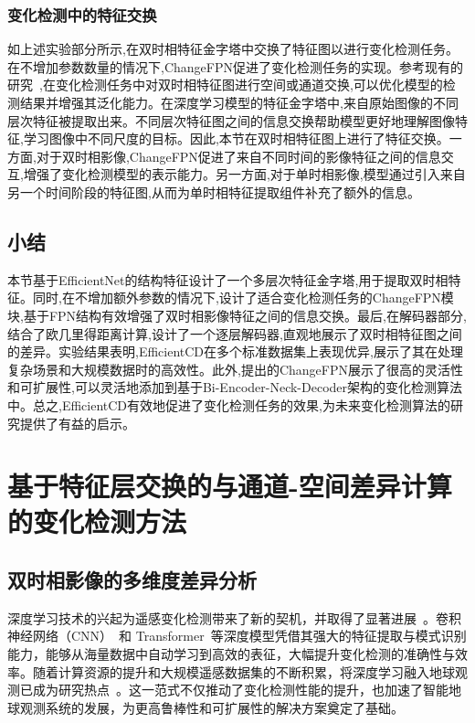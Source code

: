 \subsubsection{变化检测中的特征交换}

如上述实验部分所示,在双时相特征金字塔中交换了特征图以进行变化检测任务。在不增加参数数量的情况下,ChangeFPN促进了变化检测任务的实现。参考现有的研究~\cite{Fang2022ChangerFI},在变化检测任务中对双时相特征图进行空间或通道交换,可以优化模型的检测结果并增强其泛化能力。在深度学习模型的特征金字塔中,来自原始图像的不同层次特征被提取出来。不同层次特征图之间的信息交换帮助模型更好地理解图像特征,学习图像中不同尺度的目标。因此,本节在双时相特征图上进行了特征交换。一方面,对于双时相影像,ChangeFPN促进了来自不同时间的影像特征之间的信息交互,增强了变化检测模型的表示能力。另一方面,对于单时相影像,模型通过引入来自另一个时间阶段的特征图,从而为单时相特征提取组件补充了额外的信息。

\subsection{小结}

本节基于EfficientNet的结构特征设计了一个多层次特征金字塔,用于提取双时相特征。同时,在不增加额外参数的情况下,设计了适合变化检测任务的ChangeFPN模块,基于FPN结构有效增强了双时相影像特征之间的信息交换。最后,在解码器部分,结合了欧几里得距离计算,设计了一个逐层解码器,直观地展示了双时相特征图之间的差异。实验结果表明,EfficientCD在多个标准数据集上表现优异,展示了其在处理复杂场景和大规模数据时的高效性。此外,提出的ChangeFPN展示了很高的灵活性和可扩展性,可以灵活地添加到基于Bi-Encoder-Neck-Decoder架构的变化检测算法中。总之,EfficientCD有效地促进了变化检测任务的效果,为未来变化检测算法的研究提供了有益的启示。


\section{基于特征层交换的与通道-空间差异计算的变化检测方法}
\subsection{双时相影像的多维度差异分析}

深度学习技术的兴起为遥感变化检测带来了新的契机，并取得了显著进展~\cite{ting_bai_deep_2023}。卷积神经网络（CNN）~\cite{He2015DeepRL}和 Transformer~\cite{Vaswani2017AttentionIA}等深度模型凭借其强大的特征提取与模式识别能力，能够从海量数据中自动学习到高效的表征，大幅提升变化检测的准确性与效率。随着计算资源的提升和大规模遥感数据集的不断积累，将深度学习融入地球观测已成为研究热点~\cite{Wang2024HyperSIGMAHI}。这一范式不仅推动了变化检测性能的提升，也加速了智能地球观测系统的发展，为更高鲁棒性和可扩展性的解决方案奠定了基础。

